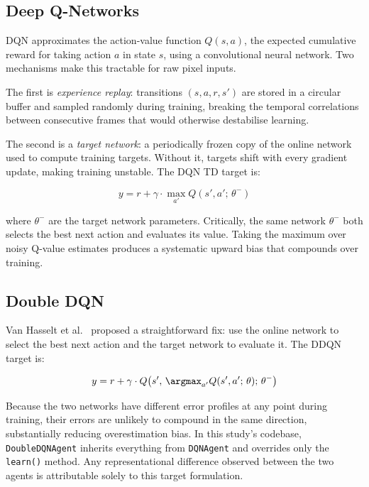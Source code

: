 \documentclass[a4paper]{article}
\begin{document}
\subsection{Deep Q-Networks}

DQN \cite{mnih2015human} approximates the action-value function $Q(s, a)$, the expected cumulative reward for taking action $a$ in state $s$, using a convolutional neural network. Two mechanisms make this tractable for raw pixel inputs.

The first is \textit{experience replay}: transitions $(s, a, r, s')$ are stored in a circular buffer and sampled randomly during training, breaking the temporal correlations between consecutive frames that would otherwise destabilise learning.

The second is a \textit{target network}: a periodically frozen copy of the online network used to compute training targets. Without it, targets shift with every gradient update, making training unstable. The DQN TD target is:

\begin{equation}
    y = r + \gamma \cdot \max_{a'} Q(s', a';\, \theta^{-})
\end{equation}

where $\theta^{-}$ are the target network parameters. Critically, the same network $\theta^{-}$ both selects the best next action and evaluates its value. Taking the maximum over noisy Q-value estimates produces a systematic upward bias that compounds over training.

\subsection{Double DQN}

Van Hasselt et al.\ \cite{van2016deep} proposed a straightforward fix: use the online network to select the best next action and the target network to evaluate it. The DDQN target is:

\begin{equation}
    y = r + \gamma \cdot Q\!\left(s',\, \argmax_{a'} Q(s', a';\, \theta);\, \theta^{-}\right)
\end{equation}

Because the two networks have different error profiles at any point during training, their errors are unlikely to compound in the same direction, substantially reducing overestimation bias. In this study's codebase, \texttt{DoubleDQNAgent} inherits everything from \texttt{DQNAgent} and overrides only the \texttt{learn()} method. Any representational difference observed between the two agents is attributable solely to this target formulation.
\end{document}
